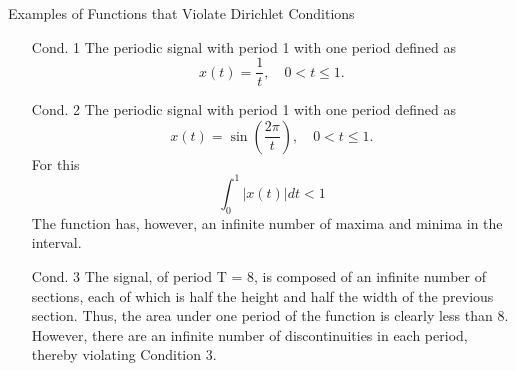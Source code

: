 \begin{frame}{Examples of Functions that Violate Dirichlet Conditions}
    \begin{itemize}
        \item [Cond. 1] The periodic signal with period 1 with one period defined as
        \begin{equation*}
            x(t) = \frac{1}{t}, \quad 0 < t\leq 1.
        \end{equation*}
        \item [Cond. 2] The periodic signal with period 1 with one period defined as
        \begin{equation*}
            x(t) = \sin\left(\frac{2\pi}{t}\right), \quad 0 < t\leq 1.
        \end{equation*}
        For this
        \begin{equation*}
            \int_0^1 \left|x(t)\right| dt < 1
        \end{equation*}
        The function has, however, an infinite number of maxima and minima in the interval.
        \item [Cond. 3] The signal, of period T = 8, is composed of an infinite number of sections, each of which is half the height and half the width of the previous section. Thus, the area under one period of the function is clearly less than 8. However, there are an infinite number of discontinuities in each period, thereby violating Condition 3.
    \end{itemize}
\end{frame} 